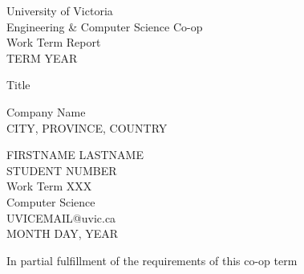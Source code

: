 \begin{center}
  University of Victoria \\
  Engineering \& Computer Science Co-op \\
  Work Term Report \\
  TERM YEAR \\                    %
  \vspace{1cm}

  {\huge Title}\\
  \vspace{1cm}

  Company Name \\
  CITY, PROVINCE, COUNTRY \\      %
  \vspace{1cm}

  FIRSTNAME LASTNAME \\
  STUDENT NUMBER \\
  Work Term XXX \\                %
  Computer Science \\
  UVICEMAIL@uvic.ca \\
  MONTH DAY, YEAR \\              %
  \vspace{1cm}

  In partial fulfillment of the requirements of this co-op term \\
  \vfill


\end{center}
